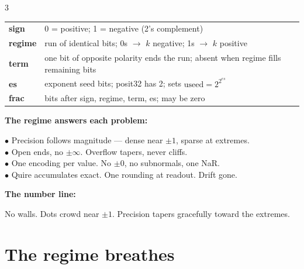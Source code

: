 \documentclass[10pt]{article}
\begin{document}
\begin{multicols}{3}
\begin{tabular}{@{}lp{4.4cm}@{}}
\textbf{sign}   & 0 = positive; 1 = negative (2's complement) \\[1pt]
\textbf{regime} & run of identical bits; 0s $\to$ $k$ negative; 1s $\to$ $k$ positive \\[1pt]
\textbf{term}   & one bit of opposite polarity ends the run; absent when regime fills remaining bits \\[1pt]
\textbf{es}     & exponent seed bits; posit32 has 2; sets $\text{useed}=2^{2^{es}}$ \\[1pt]
\textbf{frac}   & bits after sign, regime, term, es; may be zero \\
\end{tabular}

\smallskip
\noindent \textbf{The regime answers each problem:}

\noindent$\bullet$ Precision follows magnitude --- dense near $\pm 1$, sparse at extremes.\\
$\bullet$ Open ends, no $\pm\infty$. Overflow tapers, never cliffs.\\
$\bullet$ One encoding per value. No $\pm 0$, no subnormals, one NaR.\\
$\bullet$ Quire accumulates exact. One rounding at readout. Drift gone.

\vspace{1pt}
\noindent \textbf{The number line:}

\begin{center}
\end{center}

No walls. Dots crowd near $\pm 1$.
Precision tapers gracefully toward the extremes.

\medskip
\section*{The regime breathes}


\end{multicols}
\end{document}
